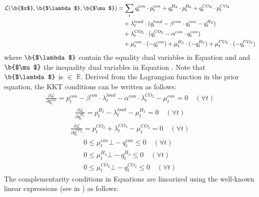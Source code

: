 \documentclass[review]{elsarticle}
\begin{document}
\begin{align}
\begin{split}
\mathcal{L}(\b{$x$}, \b{$\lambda$}, \b{$\mu$}) &=\sum_{t} q_{t}^{con} \cdot p_{t}^{con} + q_{t}^{H_2} \cdot p_{t}^{H_2} + q_{t}^{CO_2} \cdot p_{t}^{CO_2}\label{equ_follower_Lagrangian}\\
& \quad + \lambda_{t}^{load} \cdot (q_{t}^{load} - \beta^{con} \cdot q_{t}^{con} - q_{t}^{H_2})\\
& \quad + \lambda_{t}^{CO_2} \cdot (q_{t}^{CO_2} - \alpha^{con}\cdot q_{t}^{con})\\
& \quad + \mu_t^{con} \cdot (-q_{t}^{con}) + \mu_t^{H_2} \cdot (-q_{t}^{H_2}) + \mu_t^{CO_2} \cdot (-q_{t}^{CO_2})
\end{split}
\end{align}
where $\b{$\lambda$}$ contain the equality dual variables in Equation  and  and $\b{$\mu$}$ the inequality dual variables in Equation . Note that $\b{$\lambda$}$ is $\in$ $\mathbb{R}$. Derived from the Lagrangian function in the prior equation, the KKT conditions can be written as follows:
\begin{align}\label{h1}
\frac{\partial \mathcal{L}}{\partial q_{t}^{con}} = p_{t}^{con} - \beta^{con} \cdot \lambda_t^{load} - \alpha^{con}\cdot \lambda_{t}^{CO_2}-\mu_t^{con} = 0 \quad (\forall t)
\end{align}
\begin{align}\label{h2}
\frac{\partial \mathcal{L}}{\partial q_{t}^{H_2}} = p_{t}^{H_2} - \lambda_t^{load} -\mu_t^{H_2} = 0 \quad (\forall t)
\end{align}
\begin{align}\label{h3}
\frac{\partial \mathcal{L}}{\partial q_{t}^{CO_2}} = p_{t}^{CO_2} + \lambda_t^{CO_2} -\mu_t^{CO_2} = 0 \quad (\forall t)
\end{align}
\begin{align}
0 \leq \mu_t^{con} \bot -q_{t}^{con} \leq 0 \quad (\forall t) \label{CC1}\\
0 \leq \mu_t^{H_2} \bot -q_{t}^{H_2} \leq 0 \quad (\forall t) \label{CC2}\\
0 \leq \mu_t^{CO_2} \bot -q_{t}^{CO_2} \leq 0 \quad (\forall t) \label{CC3}
\end{align}
The complementarity conditions in Equations  are linearized using the well-known linear expressions (see in \cite{ruiz2009pool}) as follows:
\end{document}
